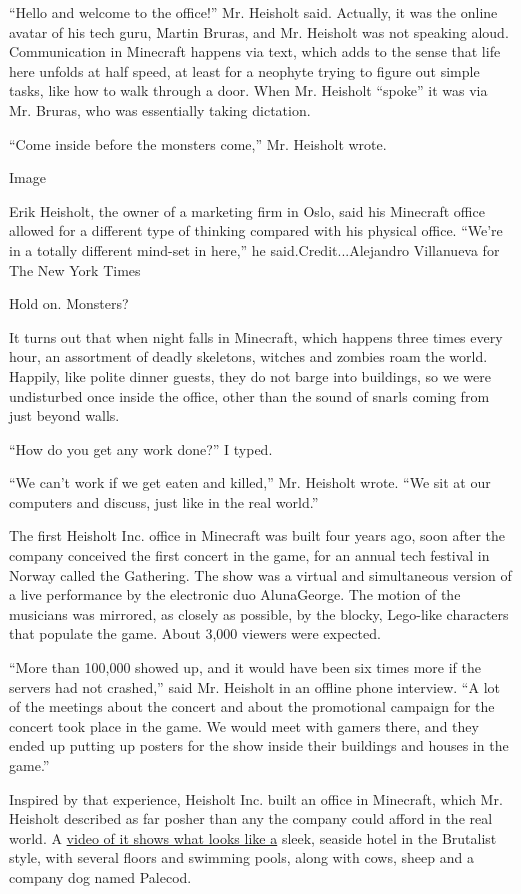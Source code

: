 ``Hello and welcome to the office!'' Mr. Heisholt said. Actually, it was
the online avatar of his tech guru, Martin Bruras, and Mr. Heisholt was
not speaking aloud. Communication in Minecraft happens via text, which
adds to the sense that life here unfolds at half speed, at least for a
neophyte trying to figure out simple tasks, like how to walk through a
door. When Mr. Heisholt ``spoke'' it was via Mr. Bruras, who was
essentially taking dictation.

``Come inside before the monsters come,'' Mr. Heisholt wrote.

Image

Erik Heisholt, the owner of a marketing firm in Oslo, said his Minecraft
office allowed for a different type of thinking compared with his
physical office. ``We're in a totally different mind-set in here,'' he
said.Credit...Alejandro Villanueva for The New York Times

Hold on. Monsters?

It turns out that when night falls in Minecraft, which happens three
times every hour, an assortment of deadly skeletons, witches and zombies
roam the world. Happily, like polite dinner guests, they do not barge
into buildings, so we were undisturbed once inside the office, other
than the sound of snarls coming from just beyond walls.

``How do you get any work done?'' I typed.

``We can't work if we get eaten and killed,'' Mr. Heisholt wrote. ``We
sit at our computers and discuss, just like in the real world.''

The first Heisholt Inc. office in Minecraft was built four years ago,
soon after the company conceived the first concert in the game, for an
annual tech festival in Norway called the Gathering. The show was a
virtual and simultaneous version of a live performance by the electronic
duo AlunaGeorge. The motion of the musicians was mirrored, as closely as
possible, by the blocky, Lego-like characters that populate the game.
About 3,000 viewers were expected.

``More than 100,000 showed up, and it would have been six times more if
the servers had not crashed,'' said Mr. Heisholt in an offline phone
interview. ``A lot of the meetings about the concert and about the
promotional campaign for the concert took place in the game. We would
meet with gamers there, and they ended up putting up posters for the
show inside their buildings and houses in the game.''

Inspired by that experience, Heisholt Inc. built an office in Minecraft,
which Mr. Heisholt described as far posher than any the company could
afford in the real world. A
\href{https://www.youtube.com/watch?v=oV0DIWfOSCU\&feature=youtu.be}{video
of it shows what looks like a} sleek, seaside hotel in the Brutalist
style, with several floors and swimming pools, along with cows, sheep
and a company dog named Palecod.

